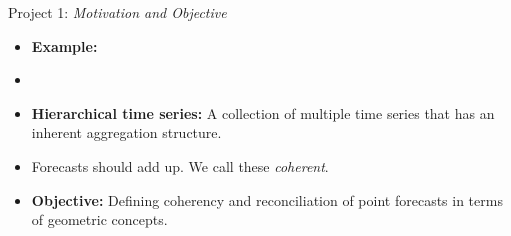 \documentclass[11pt,xcolor=dvipsnames,table]{beamer} %
\begin{document}
\begin{frame}[noframenumbering]{Project 1: \textit{Motivation and Objective}}
	\begin{itemize}[<+-| alert@+>]
			\item \textbf{Example:} 
			\begin{figure}
				
			\end{figure}
		\item []
		
		\item \textbf{Hierarchical time series:} A collection of multiple time series that has an inherent aggregation structure. 
		\item Forecasts should add up. We call these \textit{coherent}.
		\item \textbf{\color{Maroon}Objective:} Defining coherency and reconciliation of point forecasts in terms of geometric concepts.\\
		
		\end{itemize}
\end{frame}

\end{document}
